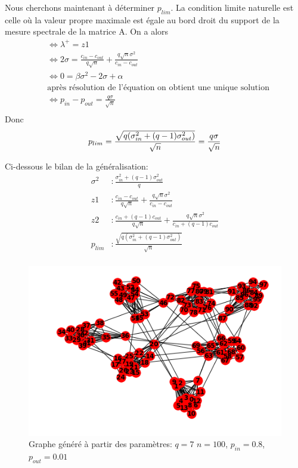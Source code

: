 Nous cherchons maintenant à déterminer $p_{lim}$.
La condition limite naturelle est celle où la valeur propre maximale est égale au bord droit du support de la mesure spectrale de la matrice A.
On a alors 
\begin{align*}
	&\Leftrightarrow \lambda^+ = z1\\
	&\Leftrightarrow 2 \sigma = \frac{c_{in} - c_{out}}{q\sqrt{n}} + \frac{q\sqrt{n}\sigma^2}{c_{in} - c_{out}}\\
	&\Leftrightarrow 0 = \beta \sigma^2 - 2 \sigma + \alpha \\
	&\text{après résolution de l'équation on obtient une unique solution}\\
	&\Leftrightarrow p_{in} - p_{out} = \frac{q\sigma}{\sqrt{n}}  \\
\end{align*}
Donc
\begin{equation}
	p_{lim} = \frac{\sqrt{q(\sigma_{in}^2 + (q-1)\sigma_{out}^2)}}{\sqrt{n}} = \frac{q\sigma}{\sqrt{n}}  \\
\end{equation}


Ci-dessous le bilan de la généralisation:
\begin{align*}
	\sigma^2&: \frac{\sigma_{in}^2 + (q-1)\sigma_{out}^2}{q} \\
	z1&: \frac{c_{in} - c_{out}}{q\sqrt{n}} + \frac{q\sqrt{n}\sigma^2}{c_{in} - c_{out}}\\
	z2&: \frac{c_{in} + (q-1)c_{out}}{q\sqrt{n}} + \frac{q\sqrt{n}\sigma^2}{c_{in} + (q-1)c_{out}}\\
	p_{lim}&: \frac{\sqrt{q(\sigma_{in}^2 + (q-1)\sigma_{out}^2)}}{\sqrt{n}} \\
\end{align*}

\begin{figure}[H]
\centering
\includegraphics[scale=0.6]{static/graph_q7_n100_pin08_pout0011.png.png}
\caption{Graphe généré à partir des paramètres: $q=7$ $n=100$, $p_{in}=0.8$, $p_{out}=0.01$}
\end{figure}
